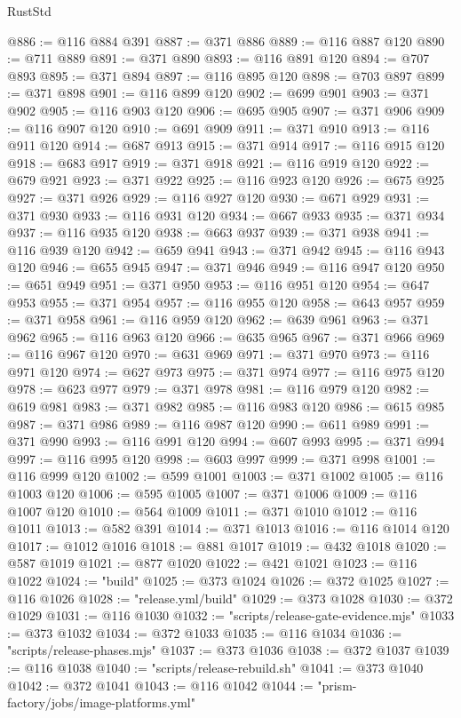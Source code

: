\begin{lexlean}{RustStd}
\begin{coremodule}
@886 := @116 @884 @391
@887 := @371 @886
@889 := @116 @887 @120
@890 := @711 @889
@891 := @371 @890
@893 := @116 @891 @120
@894 := @707 @893
@895 := @371 @894
@897 := @116 @895 @120
@898 := @703 @897
@899 := @371 @898
@901 := @116 @899 @120
@902 := @699 @901
@903 := @371 @902
@905 := @116 @903 @120
@906 := @695 @905
@907 := @371 @906
@909 := @116 @907 @120
@910 := @691 @909
@911 := @371 @910
@913 := @116 @911 @120
@914 := @687 @913
@915 := @371 @914
@917 := @116 @915 @120
@918 := @683 @917
@919 := @371 @918
@921 := @116 @919 @120
@922 := @679 @921
@923 := @371 @922
@925 := @116 @923 @120
@926 := @675 @925
@927 := @371 @926
@929 := @116 @927 @120
@930 := @671 @929
@931 := @371 @930
@933 := @116 @931 @120
@934 := @667 @933
@935 := @371 @934
@937 := @116 @935 @120
@938 := @663 @937
@939 := @371 @938
@941 := @116 @939 @120
@942 := @659 @941
@943 := @371 @942
@945 := @116 @943 @120
@946 := @655 @945
@947 := @371 @946
@949 := @116 @947 @120
@950 := @651 @949
@951 := @371 @950
@953 := @116 @951 @120
@954 := @647 @953
@955 := @371 @954
@957 := @116 @955 @120
@958 := @643 @957
@959 := @371 @958
@961 := @116 @959 @120
@962 := @639 @961
@963 := @371 @962
@965 := @116 @963 @120
@966 := @635 @965
@967 := @371 @966
@969 := @116 @967 @120
@970 := @631 @969
@971 := @371 @970
@973 := @116 @971 @120
@974 := @627 @973
@975 := @371 @974
@977 := @116 @975 @120
@978 := @623 @977
@979 := @371 @978
@981 := @116 @979 @120
@982 := @619 @981
@983 := @371 @982
@985 := @116 @983 @120
@986 := @615 @985
@987 := @371 @986
@989 := @116 @987 @120
@990 := @611 @989
@991 := @371 @990
@993 := @116 @991 @120
@994 := @607 @993
@995 := @371 @994
@997 := @116 @995 @120
@998 := @603 @997
@999 := @371 @998
@1001 := @116 @999 @120
@1002 := @599 @1001
@1003 := @371 @1002
@1005 := @116 @1003 @120
@1006 := @595 @1005
@1007 := @371 @1006
@1009 := @116 @1007 @120
@1010 := @564 @1009
@1011 := @371 @1010
@1012 := @116 @1011
@1013 := @582 @391
@1014 := @371 @1013
@1016 := @116 @1014 @120
@1017 := @1012 @1016
@1018 := @881 @1017
@1019 := @432 @1018
@1020 := @587 @1019
@1021 := @877 @1020
@1022 := @421 @1021
@1023 := @116 @1022
@1024 := "build"
@1025 := @373 @1024
@1026 := @372 @1025
@1027 := @116 @1026
@1028 := "release.yml/build"
@1029 := @373 @1028
@1030 := @372 @1029
@1031 := @116 @1030
@1032 := "scripts/release-gate-evidence.mjs"
@1033 := @373 @1032
@1034 := @372 @1033
@1035 := @116 @1034
@1036 := "scripts/release-phases.mjs"
@1037 := @373 @1036
@1038 := @372 @1037
@1039 := @116 @1038
@1040 := "scripts/release-rebuild.sh"
@1041 := @373 @1040
@1042 := @372 @1041
@1043 := @116 @1042
@1044 := "prism-factory/jobs/image-platforms.yml"

\end{coremodule}
\end{lexlean}
